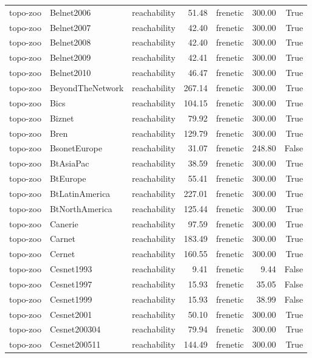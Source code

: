 \begin{tabular}{lllrlrr}
topo-zoo & Belnet2006 & reachability & 51.48 & frenetic & 300.00 & True \\
topo-zoo & Belnet2007 & reachability & 42.40 & frenetic & 300.00 & True \\
topo-zoo & Belnet2008 & reachability & 42.40 & frenetic & 300.00 & True \\
topo-zoo & Belnet2009 & reachability & 42.41 & frenetic & 300.00 & True \\
topo-zoo & Belnet2010 & reachability & 46.47 & frenetic & 300.00 & True \\
topo-zoo & BeyondTheNetwork & reachability & 267.14 & frenetic & 300.00 & True \\
topo-zoo & Bics & reachability & 104.15 & frenetic & 300.00 & True \\
topo-zoo & Biznet & reachability & 79.92 & frenetic & 300.00 & True \\
topo-zoo & Bren & reachability & 129.79 & frenetic & 300.00 & True \\
topo-zoo & BsonetEurope & reachability & 31.07 & frenetic & 248.80 & False \\
topo-zoo & BtAsiaPac & reachability & 38.59 & frenetic & 300.00 & True \\
topo-zoo & BtEurope & reachability & 55.41 & frenetic & 300.00 & True \\
topo-zoo & BtLatinAmerica & reachability & 227.01 & frenetic & 300.00 & True \\
topo-zoo & BtNorthAmerica & reachability & 125.44 & frenetic & 300.00 & True \\
topo-zoo & Canerie & reachability & 97.59 & frenetic & 300.00 & True \\
topo-zoo & Carnet & reachability & 183.49 & frenetic & 300.00 & True \\
topo-zoo & Cernet & reachability & 160.55 & frenetic & 300.00 & True \\
topo-zoo & Cesnet1993 & reachability & 9.41 & frenetic & 9.44 & False \\
topo-zoo & Cesnet1997 & reachability & 15.93 & frenetic & 35.05 & False \\
topo-zoo & Cesnet1999 & reachability & 15.93 & frenetic & 38.99 & False \\
topo-zoo & Cesnet2001 & reachability & 50.10 & frenetic & 300.00 & True \\
topo-zoo & Cesnet200304 & reachability & 79.94 & frenetic & 300.00 & True \\
topo-zoo & Cesnet200511 & reachability & 144.49 & frenetic & 300.00 & True \\

\end{tabular}
